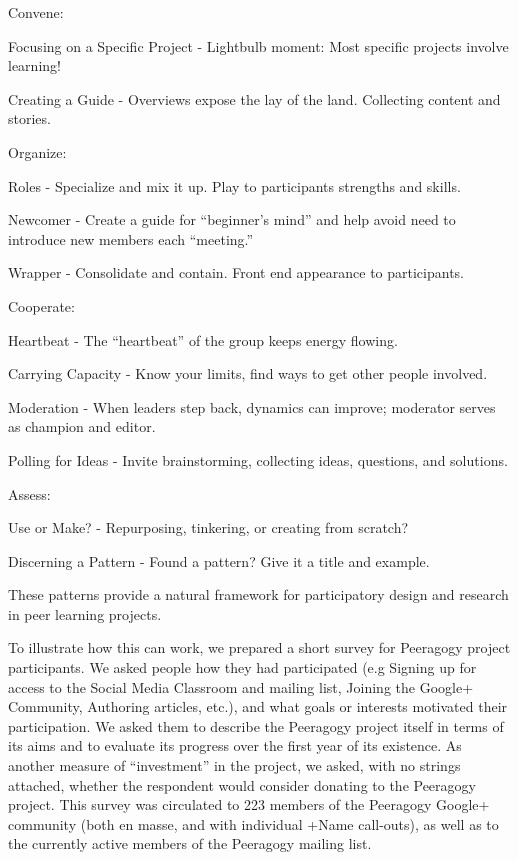 \documentclass{acm_proc_article-sp}
\begin{document}
Convene:

    Focusing on a Specific Project - Lightbulb moment: Most specific projects involve learning!

    Creating a Guide - Overviews expose the lay of the land. Collecting content and stories.

Organize:

    Roles - Specialize and mix it up. Play to participants strengths and skills.

    Newcomer - Create a guide for ``beginner's mind'' and help avoid need to introduce new members each ``meeting.''

    Wrapper - Consolidate and contain. Front end appearance to participants.

Cooperate:

    Heartbeat - The ``heartbeat'' of the group keeps energy flowing.

    Carrying Capacity - Know your limits, find ways to get other people involved.

    Moderation - When leaders step back, dynamics can improve; moderator serves as champion and editor.

    Polling for Ideas - Invite brainstorming, collecting ideas, questions, and solutions.

Assess:

    Use or Make? - Repurposing, tinkering, or creating from scratch?

    Discerning a Pattern - Found a pattern? Give it a title and example.


These patterns provide a natural framework for participatory design and research in peer learning projects.

To illustrate how this can work, we prepared a short survey for Peeragogy project participants. We asked people how they had participated (e.g Signing up for access to the Social Media Classroom and mailing list, Joining the Google+ Community, Authoring articles, etc.), and what goals or interests motivated their participation. We asked them to describe the Peeragogy project itself in terms of its aims and to evaluate its progress over the first year of its existence. As another measure of ``investment'' in the project, we asked, with no strings attached, whether the respondent would consider donating to the Peeragogy project. This survey was circulated to 223 members of the Peeragogy Google+ community (both en masse, and with individual +Name call-outs), as well as to the currently active members of the Peeragogy mailing list.
\end{document}
